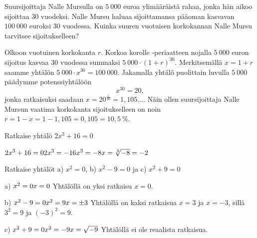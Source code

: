 \begin{esimerkki}
	Suursijoittaja Nalle Mursulla on $5~000$ euroa ylimääräistä rahaa, jonka hän aikoo sijoittaa $30$ vuodeksi.  Nalle Mursu haluaa sijoittamansa pääoman kasvavan $100~000$ euroksi $30$ vuodessa.  Kuinka suuren vuotuisen korkokannan Nalle Mursu tarvitsee sijoitukselleen? 
	\begin{esimratk}
		Olkoon vuotuinen korkokanta $r$. Korkoa korolle -periaatteen nojalla $5~000$ euron sijoitus
		kasvaa $30$ vuodessa summaksi $5~000\cdot(1+r)^{30}$. Merkitsemällä $x=1+r$ saamme yhtälön $5~000\cdot x^{30} = 100~000$.
		Jakamalla yhtälö puolittain luvulla $5~000$ päädymme potenssiyhtälöön
		\[ x^{30} = 20, \] 
		jonka ratkaisuksi saadaan $x=20^{\frac{1}{30}} = 1{,}105\ldots$. Näin
		ollen suursijoittaja Nalle Mursun vaatima korkokanta sijoitukselleen on noin $r=1-x=1-1,105=0,105=10{,}5~\%$.
	\end{esimratk}
\end{esimerkki}


\begin{esimerkki}
Ratkaise yhtälö $2x^3 + 16 = 0$

	$2x^3 + 16 = 0 \\
	2x^3 = -16 \\
	x^3 = -8  \\
	x = \sqrt[3]{-8} = -2 $
\end{esimerkki}


\begin{esimerkki}
Ratkaise yhtälöt a) $x^2 = 0$, b) $x^2 - 9 = 0$ ja c) $x^2 + 9 = 0$

a)	$x^2 = 0 \\
	x = 0 \\$
	Yhtälöllä on yksi ratkaisu $x = 0$.

b)	$x^2 - 9 = 0 \\
	x^2 = 9 \\
	x = \pm 3 \\$
	Yhtälöllä on kaksi ratkaisua $x = 3$ ja $x = -3$, sillä $3^2 = 9$ ja $(-3)^2 = 9$.

c)	$x^2 + 9 = 0 \\
	x^2 = -9 \\
	x = \sqrt{-9} \\$
	Yhtälöllä ei ole reaalista ratkaisua.

\end{esimerkki}